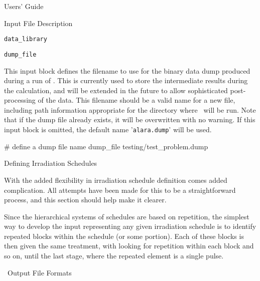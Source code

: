\begin{chapter}{Users' Guide\label{app:user.guide}}
\begin{section}{Input File Description\label{app:user.input}}
\begin{subsection}{\texttt{data\_library}\label{sec:user.input.datalib}}
    \end{subsection}

    \begin{subsection}{\texttt{dump\_file}\label{sec:user.input.dump}}
      
      This input block defines the filename to use for the binary data
      dump produced during a run of \ALARA.  This is currently used to
      store the intermediate results during the calculation, and will
      be extended in the future to allow sophisticated post-processing
      of the data.  This filename should be a valid name for a new
      file, including path information appropriate for the directory
      where \ALARA\ will be run.  Note that if the dump file already
      exists, it will be overwritten with no warning.  If this input
      block is omitted, the default name '\texttt{alara.dump}' will be
      used.

      \begin{center}
        \renewcommand{\baselinestretch}{1}\normalsize
        \begin{boxedverbatim}
# define a dump file name
dump_file testing/test_problem.dump          
\end{boxedverbatim}
      \end{center}

    \end{subsection}

  \end{section}
  
  \begin{section}{Defining Irradiation Schedules\label{app:user.schedules}}
    
    With the added flexibility in irradiation schedule definition
    comes added complication.  All attempts have been made for this to
    be a straightforward process, and this section should help make it
    clearer.
    
    Since the hierarchical systems of schedules are based on
    repetition, the simplest way to develop the input representing any
    given irradiation schedule is to identify repeated blocks within
    the schedule (or some portion).  Each of these blocks is then
    given the same treatment, with looking for repetition within each
    block and so on, until the last stage, where the repeated element
    is a single pulse.

  \end{section}

  \begin{section}{\ALARA\ Output File Formats\label{app:user.output}}


\end{section}
\end{chapter}
